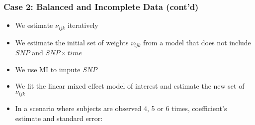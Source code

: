 \documentclass[pdf]{beamer}
\begin{document}
\begin{frame}
\frametitle{Case 2: Balanced and Incomplete Data (cont'd)}
\begin{itemize}
	\item We estimate $\nu_{ijk}$ iteratively
	\item We estimate the initial set of weights $\nu_{ijk}$ from a model that does not include $SNP$ and $SNP \times time$
	\item We use MI to impute $SNP$
	\item We fit the linear mixed effect model of interest and estimate the new set of $\nu_{ijk}$
	\item In a scenario where subjects are observed 4, 5 or 6 times, coefficient's estimate and standard error:
	\begin{table}[H]
		\centering
	\end{table}
\end{itemize}
\end{frame}
\end{document}
